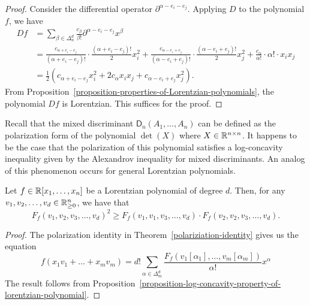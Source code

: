 \documentclass{puthesis-UG}
\begin{document}
\begin{proof}
	Consider the differential operator $\partial^{\alpha - e_i - e_j}$. Applying $D$ to the polynomial $f$, we have 
	\begin{align*}
		D f & = \sum_{\beta \in \Delta_n^d} \frac{c_\beta}{\beta!} \partial^{\alpha - e_i - e_j} x^\beta \\
		& = \frac{c_{\alpha + e_i - e_j}}{(\alpha + e_i - e_j)!} \cdot \frac{(\alpha + e_i - e_j)!}{2} x_i^2 + \frac{c_{\alpha - e_i + e_j}}{(\alpha - e_i + e_j)!} \cdot \frac{(\alpha - e_i + e_j)!}{2} x_j^2 + \frac{c_\alpha}{\alpha !} \cdot \alpha! \cdot x_ix_j \\
		& = \frac{1}{2} \left ( c_{\alpha + e_i - e_j} x_i^2 + 2 c_\alpha x_i x_j + c_{\alpha - e_i + e_j} x_j^2 \right ).
	\end{align*}
	From Proposition~\ref{proposition-properties-of-Lorentzian-polynomials}, the polynomial $Df$ is Lorentzian. This suffices for the proof. 
\end{proof}

Recall that the mixed discriminant $\mathsf{D}_n(A_1, \ldots, A_n)$ can be defined as the polarization form of the polynomial $\det (X)$ where $X \in \mathbb{R}^{n \times n}$. It happens to be the case that the polarization of this polynomial satisfies a log-concavity inequality given by the Alexandrov inequality for mixed discriminants. An analog of this phenomenon occurs for general Lorentzian polynomials. 

\begin{prop} \label{prop:analog-of-alexandrov-fenchel}
	Let $f \in \mathbb{R}[x_1, \ldots, x_n]$ be a Lorentzian polynomial of degree $d$. Then, for any $v_1, v_2, \ldots, v_d \in \mathbb{R}_{\geq 0}^n$, we have that 
	\[
		F_f(v_1, v_2, v_3, \ldots, v_d)^2 \geq F_f(v_1, v_1, v_3, \ldots, v_d) \cdot F_f(v_2, v_2, v_3, \ldots, v_d).
	\] 
\end{prop}

\begin{proof}
	The polarization identity in Theorem~\ref{polariziation-identity} gives us the equation 
	\begin{equation} \label{eqn:yesyesyes}
		f(x_1 v_1 + \ldots + x_m v_m) = d! \sum_{\alpha \in \Delta_m^d} \frac{F_f(v_1[\alpha_1], \ldots, v_m[\alpha_m])}{\alpha!} x^\alpha
	\end{equation}
	The result follows from Proposition~\ref{proposition-log-concavity-property-of-lorentzian-polynomial}. 
\end{proof}
\end{document}

